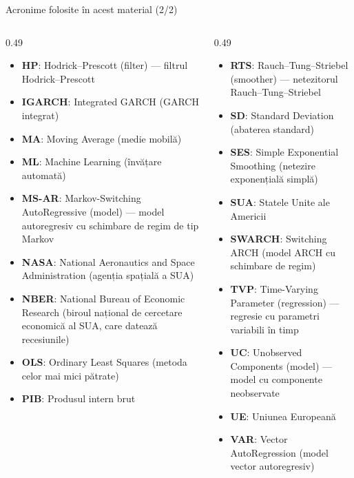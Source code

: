 \begin{frame}{Acronime folosite în acest material (2/2)}
\begin{columns}[T]
\begin{column}{0.49\textwidth}
\begin{itemize}\setlength{\itemsep}{0pt}
    \item \textbf{HP}: Hodrick–Prescott (filter) — filtrul Hodrick–Prescott
    \item \textbf{IGARCH}: Integrated GARCH (GARCH integrat)
    \item \textbf{MA}: Moving Average (medie mobilă)
    \item \textbf{ML}: Machine Learning (învățare automată)
    \item \textbf{MS-AR}: Markov-Switching AutoRegressive (model) — model autoregresiv cu schimbare de regim de tip Markov
    \item \textbf{NASA}: National Aeronautics and Space Administration (agenția spațială a SUA)
    \item \textbf{NBER}: National Bureau of Economic Research (biroul național de cercetare economică al SUA, care datează recesiunile)
    \item \textbf{OLS}: Ordinary Least Squares (metoda celor mai mici pătrate)
    \item \textbf{PIB}: Produsul intern brut
\end{itemize}
\end{column}
\begin{column}{0.49\textwidth}
\begin{itemize}\setlength{\itemsep}{0pt}
    \item \textbf{RTS}: Rauch–Tung–Striebel (smoother) — netezitorul Rauch–Tung–Striebel
    \item \textbf{SD}: Standard Deviation (abaterea standard)
    \item \textbf{SES}: Simple Exponential Smoothing (netezire exponențială simplă)
    \item \textbf{SUA}: Statele Unite ale Americii
    \item \textbf{SWARCH}: Switching ARCH (model ARCH cu schimbare de regim)
    \item \textbf{TVP}: Time-Varying Parameter (regression) — regresie cu parametri variabili în timp
    \item \textbf{UC}: Unobserved Components (model) — model cu componente neobservate
    \item \textbf{UE}: Uniunea Europeană
    \item \textbf{VAR}: Vector AutoRegression (model vector autoregresiv)
\end{itemize}
\end{column}
\end{columns}
\end{frame}

